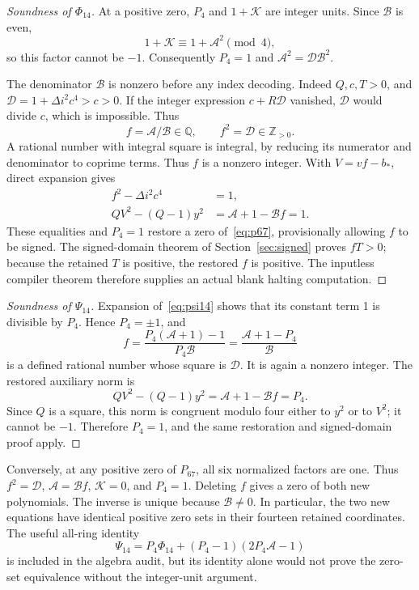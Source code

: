 \documentclass[11pt,a4paper]{article}
\theoremstyle{remark}\newtheorem{remark}[theorem]{Remark}
\newcommand{\Pos}{\mathbb Z_{>0}}
\newcommand{\QQ}{\mathbb Q}
\begin{document}
\begin{proof}[Soundness of \(\Phi_{14}\)]
At a positive zero, \(P_4\) and \(1+\mathcal K\) are integer units.
Since \(\mathcal B\) is even,
\[
 1+\mathcal K\equiv1+\mathcal A^2\pmod4,
\]
so this factor cannot be \(-1\). Consequently \(P_4=1\) and
\(\mathcal A^2=\mathcal D\mathcal B^2\).

The denominator \(\mathcal B\) is nonzero before any index decoding.
Indeed \(Q,c,T>0\), and
\(\mathcal D=1+\Delta i^2c^4>c>0\). If the integer expression
\(c+R\mathcal D\) vanished, \(\mathcal D\) would divide \(c\), which
is impossible. Thus
\[
 f=\mathcal A/\mathcal B\in\QQ,\qquad f^2=\mathcal D\in\Pos.
\]
A rational number with integral square is integral, by reducing its
numerator and denominator to coprime terms. Thus \(f\) is a nonzero
integer. With \(V=vf-b_*\), direct expansion gives
\begin{align*}
 f^2-\Delta i^2c^4&=1,\\
 QV^2-(Q-1)y^2&=\mathcal A+1-\mathcal Bf=1.
\end{align*}
These equalities and \(P_4=1\) restore a zero of~\eqref{eq:p67},
provisionally allowing \(f\) to be signed. The signed-domain theorem of
Section~\ref{sec:signed} proves \(fT>0\); because the retained \(T\) is
positive, the restored \(f\) is positive. The inputless compiler theorem
therefore supplies an actual blank halting computation.
\end{proof}

\begin{proof}[Soundness of \(\Psi_{14}\)]
Expansion of~\eqref{eq:psi14} shows that its constant term 1 is divisible
by \(P_4\). Hence \(P_4=\pm1\), and
\[
 f=\frac{P_4(\mathcal A+1)-1}{P_4\mathcal B}
   =\frac{\mathcal A+1-P_4}{\mathcal B}
\]
is a defined rational number whose square is \(\mathcal D\). It is again
a nonzero integer. The restored auxiliary norm is
\[
 QV^2-(Q-1)y^2=\mathcal A+1-\mathcal Bf=P_4.
\]
Since \(Q\) is a square, this norm is congruent modulo four either to
\(y^2\) or to \(V^2\); it cannot be \(-1\). Therefore
\(P_4=1\), and the same restoration and signed-domain proof apply.
\end{proof}

Conversely, at any positive zero of \(P_{67}\), all six normalized
factors are one. Thus \(f^2=\mathcal D\),
\(\mathcal A=\mathcal Bf\), \(\mathcal K=0\), and \(P_4=1\).
Deleting \(f\) gives a zero of both new polynomials. The inverse is
unique because \(\mathcal B\ne0\). In particular, the two new equations
have identical positive zero sets in their fourteen retained coordinates.
The useful all-ring identity
\begin{equation}
 \Psi_{14}=P_4\Phi_{14}+(P_4-1)(2P_4\mathcal A-1)
 \label{eq:rootidentity}
\end{equation}
is included in the algebra audit, but its identity alone would not prove
the zero-set equivalence without the integer-unit argument.
\end{document}
